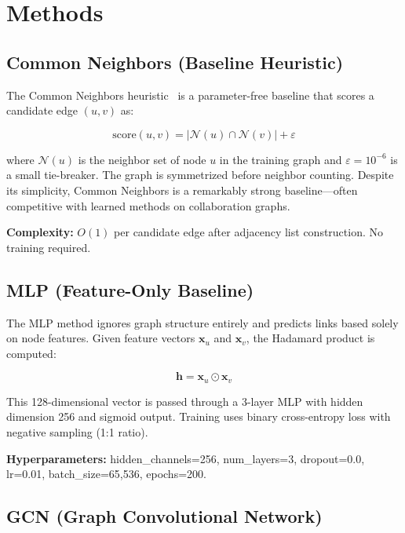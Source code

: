\documentclass[12pt,a4paper]{article}
\begin{document}
\section{Methods}

\subsection{Common Neighbors (Baseline Heuristic)}

The Common Neighbors heuristic~\cite{newman2001} is a parameter-free baseline that scores a candidate edge $(u,v)$ as:

\begin{equation}
    \text{score}(u,v) = |\mathcal{N}(u) \cap \mathcal{N}(v)| + \varepsilon
\end{equation}

where $\mathcal{N}(u)$ is the neighbor set of node $u$ in the training graph and $\varepsilon = 10^{-6}$ is a small tie-breaker. The graph is symmetrized before neighbor counting. Despite its simplicity, Common Neighbors is a remarkably strong baseline—often competitive with learned methods on collaboration graphs.

\textbf{Complexity:} $O(1)$ per candidate edge after adjacency list construction. No training required.

\subsection{MLP (Feature-Only Baseline)}

The MLP method ignores graph structure entirely and predicts links based solely on node features. Given feature vectors $\mathbf{x}_u$ and $\mathbf{x}_v$, the Hadamard product is computed:

\begin{equation}
    \mathbf{h} = \mathbf{x}_u \odot \mathbf{x}_v
\end{equation}

This 128-dimensional vector is passed through a 3-layer MLP with hidden dimension 256 and sigmoid output. Training uses binary cross-entropy loss with negative sampling (1:1 ratio).

\textbf{Hyperparameters:} hidden\_channels=256, num\_layers=3, dropout=0.0, lr=0.01, batch\_size=65,536, epochs=200.

\subsection{GCN (Graph Convolutional Network)}
\end{document}

